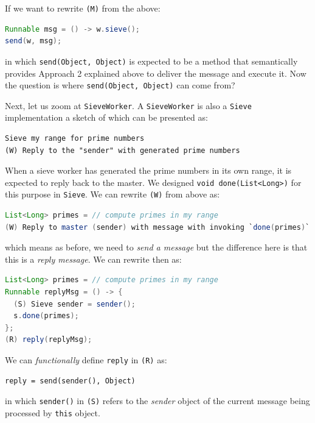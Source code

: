 If we want to rewrite \lstinline!(M)! from the above:

\begin{lstlisting}[language=Java]
Runnable msg = () -> w.sieve();
send(w, msg);
\end{lstlisting}

in which \lstinline!send(Object, Object)! is expected to be a method
that semantically provides Approach 2 explained above to deliver the
message and execute it. Now the question is where
\lstinline!send(Object, Object)! can come from?

Next, let us zoom at \lstinline!SieveWorker!. A \lstinline!SieveWorker!
is also a \lstinline!Sieve! implementation a sketch of which can be
presented as:

\begin{lstlisting}
Sieve my range for prime numbers
(W) Reply to the "sender" with generated prime numbers
\end{lstlisting}

When a sieve worker has generated the prime numbers in its own range, it
is expected to reply back to the master. We designed
\lstinline!void done(List<Long>)! for this purpose in \lstinline!Sieve!.
We can rewrite \lstinline!(W)! from above as:

\begin{lstlisting}[language=Java]
List<Long> primes = // compute primes in my range
(W) Reply to master (sender) with message with invoking `done(primes)`
\end{lstlisting}

which means as before, we need to \emph{send a message} but the
difference here is that this is a \emph{reply message}. We can rewrite
then as:

\begin{lstlisting}[language=Java]
List<Long> primes = // compute primes in my range
Runnable replyMsg = () -> {
  (S) Sieve sender = sender();
  s.done(primes);
};
(R) reply(replyMsg);
\end{lstlisting}

We can \emph{functionally} define \lstinline!reply! in \lstinline!(R)!
as:

\begin{lstlisting}
reply = send(sender(), Object)
\end{lstlisting}

in which \lstinline!sender()! in \lstinline!(S)! refers to the
\emph{sender} object of the current message being processed by
\lstinline!this! object.

